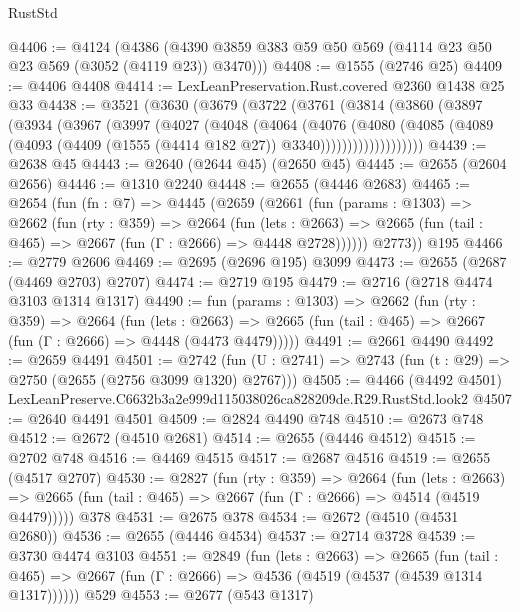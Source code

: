 \begin{lexlean}{RustStd}
\begin{coremodule}
@4406 := @4124
    (@4386 (@4390 @3859 @383 @59 @50 @569 (@4114 @23 @50 @23 @569 (@3052 (@4119 @23)) @3470)))
@4408 := @1555 (@2746 @25)
@4409 := @4406 @4408
@4414 := LexLeanPreservation.Rust.covered @2360 @1438 @25 @33
@4438 := @3521
    (@3630
      (@3679
        (@3722
          (@3761
            (@3814
              (@3860
                (@3897
                  (@3934
                    (@3967
                      (@3997
                        (@4027
                          (@4048
                            (@4064
                              (@4076
                                (@4080
                                  (@4085
                                    (@4089
                                      (@4093
                                        (@4409 (@1555 (@4414 @182 @27)) @3340)))))))))))))))))))
@4439 := @2638 @45
@4443 := @2640 (@2644 @45) (@2650 @45)
@4445 := @2655 (@2604 @2656)
@4446 := @1310 @2240
@4448 := @2655 (@4446 @2683)
@4465 := @2654
    (fun (fn : @7) =>
    @4445
      (@2659
        (@2661
          (fun (params : @1303) =>
          @2662
            (fun (rty : @359) =>
            @2664
              (fun (lets : @2663) =>
              @2665 (fun (tail : @465) => @2667 (fun (Γ : @2666) => @4448 @2728))))))
        @2773))
    @195
@4466 := @2779 @2606
@4469 := @2695 (@2696 @195) @3099
@4473 := @2655 (@2687 (@4469 @2703) @2707)
@4474 := @2719 @195
@4479 := @2716 (@2718 @4474 @3103 @1314 @1317)
@4490 := fun (params : @1303) =>
  @2662
    (fun (rty : @359) =>
    @2664
      (fun (lets : @2663) =>
      @2665 (fun (tail : @465) => @2667 (fun (Γ : @2666) => @4448 (@4473 @4479)))))
@4491 := @2661 @4490
@4492 := @2659 @4491
@4501 := @2742 (fun (U : @2741) => @2743 (fun (t : @29) => @2750 (@2655 (@2756 @3099 @1320) @2767)))
@4505 := @4466 (@4492 @4501) LexLeanPreserve.C6632b3a2e999d115038026ca828209de.R29.RustStd.look2
@4507 := @2640 @4491 @4501
@4509 := @2824 @4490 @748
@4510 := @2673 @748
@4512 := @2672 (@4510 @2681)
@4514 := @2655 (@4446 @4512)
@4515 := @2702 @748
@4516 := @4469 @4515
@4517 := @2687 @4516
@4519 := @2655 (@4517 @2707)
@4530 := @2827
    (fun (rty : @359) =>
    @2664
      (fun (lets : @2663) =>
      @2665 (fun (tail : @465) => @2667 (fun (Γ : @2666) => @4514 (@4519 @4479)))))
    @378
@4531 := @2675 @378
@4534 := @2672 (@4510 (@4531 @2680))
@4536 := @2655 (@4446 @4534)
@4537 := @2714 @3728
@4539 := @3730 @4474 @3103
@4551 := @2849
    (fun (lets : @2663) =>
    @2665
      (fun (tail : @465) => @2667 (fun (Γ : @2666) => @4536 (@4519 (@4537 (@4539 @1314 @1317))))))
    @529
@4553 := @2677 (@543 @1317)

\end{coremodule}
\end{lexlean}
